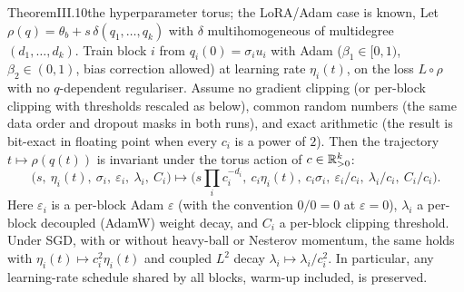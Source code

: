 \begin{restate}{Theorem}{III.10}{the hyperparameter torus; the LoRA/Adam case is known, \citet{schulman2025lora}}
Let $\rho(q)=\theta_b+s\,\delta(q_1,\dots,q_k)$ with $\delta$ multihomogeneous of multidegree $(d_1,\dots,d_k)$. Train block
$i$ from $q_i(0)=\sigma_iu_i$ with Adam ($\beta_1\in[0,1)$, $\beta_2\in(0,1)$, bias correction allowed) at learning rate
$\eta_i(t)$, on the loss $L\circ\rho$ with no $q$-dependent regulariser. Assume no gradient clipping (or per-block
clipping with thresholds rescaled as below), common random numbers (the same data order and dropout masks in both runs),
and exact arithmetic (the result is bit-exact in floating point when every $c_i$ is a power of $2$). Then the trajectory
$t\mapsto\rho(q(t))$ is invariant under the torus action of $c\in\mathbb{R}_{>0}^k$:
\[\big(s,\ \eta_i(t),\ \sigma_i,\ \varepsilon_i,\ \lambda_i,\ C_i\big)\mapsto\Big(s\prod_ic_i^{-d_i},\ c_i\eta_i(t),\ c_i\sigma_i,\ \varepsilon_i/c_i,\ \lambda_i/c_i,\ C_i/c_i\Big).\]
Here $\varepsilon_i$ is a per-block Adam $\varepsilon$ (with the convention $0/0=0$ at $\varepsilon=0$), $\lambda_i$ a
per-block decoupled (AdamW) weight decay, and $C_i$ a per-block clipping threshold. Under SGD, with or without heavy-ball
or Nesterov momentum, the same holds with $\eta_i(t)\mapsto c_i^2\eta_i(t)$ and coupled $L^2$ decay
$\lambda_i\mapsto\lambda_i/c_i^2$. In particular, any learning-rate schedule shared by all blocks, warm-up included, is
preserved.
\end{restate}

